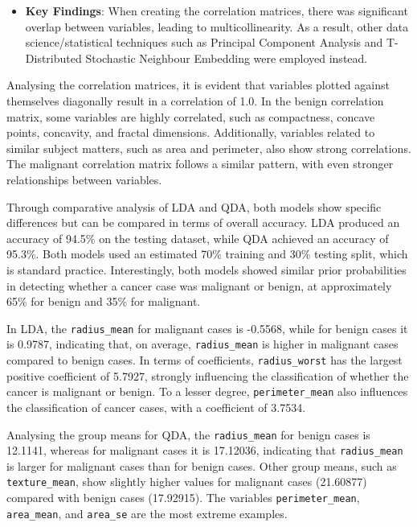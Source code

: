 \documentclass[
]{article}
\providecommand{\tightlist}{%
  \setlength{\itemsep}{0pt}\setlength{\parskip}{0pt}}
\begin{document}
\begin{itemize}
\tightlist
\item
  \textbf{Key Findings}: When creating the correlation matrices, there
  was significant overlap between variables, leading to
  multicollinearity. As a result, other data science/statistical
  techniques such as Principal Component Analysis and T-Distributed
  Stochastic Neighbour Embedding were employed instead.
\end{itemize}

Analysing the correlation matrices, it is evident that variables plotted
against themselves diagonally result in a correlation of 1.0. In the
benign correlation matrix, some variables are highly correlated, such as
compactness, concave points, concavity, and fractal dimensions.
Additionally, variables related to similar subject matters, such as area
and perimeter, also show strong correlations. The malignant correlation
matrix follows a similar pattern, with even stronger relationships
between variables.

Through comparative analysis of LDA and QDA, both models show specific
differences but can be compared in terms of overall accuracy. LDA
produced an accuracy of 94.5\% on the testing dataset, while QDA
achieved an accuracy of 95.3\%. Both models used an estimated 70\%
training and 30\% testing split, which is standard practice.
Interestingly, both models showed similar prior probabilities in
detecting whether a cancer case was malignant or benign, at
approximately 65\% for benign and 35\% for malignant.

In LDA, the \texttt{radius\_mean} for malignant cases is -0.5568, while
for benign cases it is 0.9787, indicating that, on average,
\texttt{radius\_mean} is higher in malignant cases compared to benign
cases. In terms of coefficients, \texttt{radius\_worst} has the largest
positive coefficient of 5.7927, strongly influencing the classification
of whether the cancer is malignant or benign. To a lesser degree,
\texttt{perimeter\_mean} also influences the classification of cancer
cases, with a coefficient of 3.7534.

Analysing the group means for QDA, the \texttt{radius\_mean} for benign
cases is 12.1141, whereas for malignant cases it is 17.12036, indicating
that \texttt{radius\_mean} is larger for malignant cases than for benign
cases. Other group means, such as \texttt{texture\_mean}, show slightly
higher values for malignant cases (21.60877) compared with benign cases
(17.92915). The variables \texttt{perimeter\_mean}, \texttt{area\_mean},
and \texttt{area\_se} are the most extreme examples.
\end{document}
